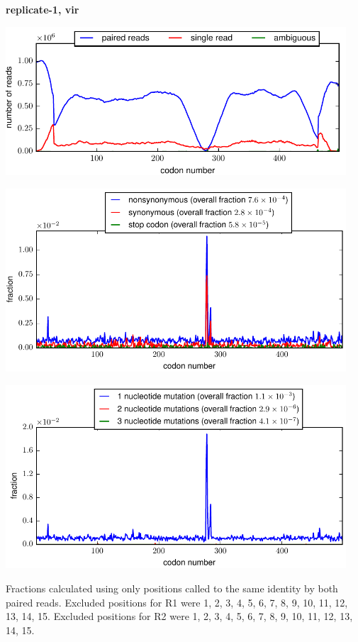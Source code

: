 \documentclass[10pt,letterpaper]{article}
\begin{document}
\centerline{\Large \bf replicate-1, vir}
\vspace{0.1in}

\centerline{\includegraphics[width=5in]{replicate-1-vir_codondepth.pdf}}
\vspace{0.1in}

\centerline{\includegraphics[width=5in]{replicate-1-vir_syn-ns-dist.pdf}}
\vspace{0.1in}

\centerline{\includegraphics[width=5in]{replicate-1-vir_nmutspercodon-dist.pdf}}
\vspace{0.1in}

Fractions calculated using only positions called to the same identity by both paired reads.  Excluded positions for R1 were 1, 2, 3, 4, 5, 6, 7, 8, 9, 10, 11, 12, 13, 14, 15. 
 Excluded positions for R2 were 1, 2, 3, 4, 5, 6, 7, 8, 9, 10, 11, 12, 13, 14, 15. 
\end{document}
